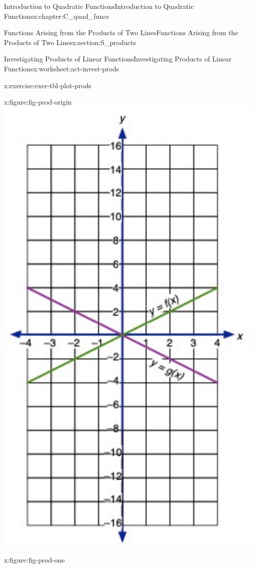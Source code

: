\documentclass[oneside,10pt,]{book}
\numberwithin{equation}{chapter}
\begin{document}
\begin{chapterptx}{Introduction to Quadratic Functions}{}{Introduction to Quadratic Functions}{}{}{x:chapter:C_quad_funcs}
\begin{sectionptx}{Functions Arising from the Products of Two Lines}{}{Functions Arising from the Products of Two Lines}{}{}{x:section:S_products}
\begin{worksheet-subsection}{Investigating Products of Linear Functions}{}{Investigating Products of Linear Functions}{}{}{x:worksheet:act-invest-prods}
\begin{divisionexercise}{1}{}{}{x:exercise:exer-tbl-plot-prods}
\begin{sidebyside}{3}{0}{0}{0}
\begin{sbspanel}{0.333333333333333}
\begin{figureptx}{}{x:figure:fig-prod-origin}{}
\includegraphics[width=\linewidth]{external/prod-origin.pdf}
\tcblower
\end{figureptx}%
\end{sbspanel}%
\begin{sbspanel}{0.333333333333333}%
\begin{figureptx}{}{x:figure:fig-prod-one}{}%

\end{figureptx}
\end{sbspanel}
\end{sidebyside}
\end{divisionexercise}
\end{worksheet-subsection}
\end{sectionptx}
\end{chapterptx}
\end{document}
